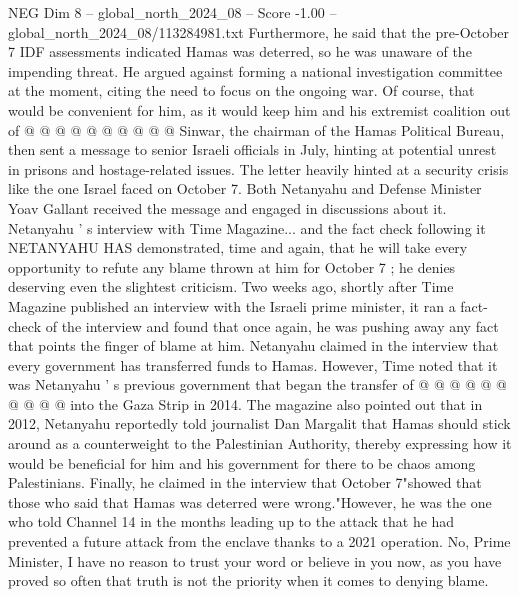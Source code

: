\begin{textsample}{NEG Dim 8 – global\_north\_2024\_08 – Score -1.00 – global\_north\_2024\_08/113284981.txt}
Furthermore, he said that the pre-October 7 IDF assessments indicated Hamas was deterred, so he was unaware of the impending threat.
He argued against forming a national investigation committee at the moment, citing the need to focus on the ongoing war.
Of course, that would be convenient for him, as it would keep him and his extremist coalition out of @ @ @ @ @ @ @ @ @ @ Sinwar, the chairman of the Hamas Political Bureau, then sent a message to senior Israeli officials in July, hinting at potential unrest in prisons and hostage-related issues.
The letter heavily hinted at a security crisis like the one Israel faced on October 7.
Both Netanyahu and Defense Minister Yoav Gallant received the message and engaged in discussions about it.
Netanyahu ' s interview with Time Magazine... and the fact check following it NETANYAHU HAS demonstrated, time and again, that he will take every opportunity to refute any blame thrown at him for October 7 ; he denies deserving even the slightest criticism.
Two weeks ago, shortly after Time Magazine published an interview with the Israeli prime minister, it ran a fact-check of the interview and found that once again, he was pushing away any fact that points the finger of blame at him.
Netanyahu claimed in the interview that every government has transferred funds to Hamas.
However, Time noted that it was Netanyahu ' s previous government that began the transfer of @ @ @ @ @ @ @ @ @ @ into the Gaza Strip in 2014.
The magazine also pointed out that in 2012, Netanyahu reportedly told journalist Dan Margalit that Hamas should stick around as a counterweight to the Palestinian Authority, thereby expressing how it would be beneficial for him and his government for there to be chaos among Palestinians.
Finally, he claimed in the interview that October 7"showed that those who said that Hamas was deterred were wrong."However, he was the one who told Channel 14 in the months leading up to the attack that he had prevented a future attack from the enclave thanks to a 2021 operation.
No, Prime Minister, I have no reason to trust your word or believe in you now, as you have proved so often that truth is not the priority when it comes to denying blame.

\end{textsample}
